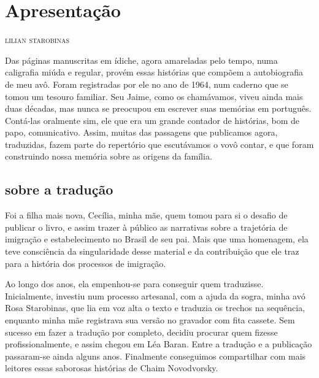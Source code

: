 \pagestyle{plain}
\newcommand{\subtitulo}[1]{\NoCaseChange{\textnormal{\break\Large\itshape#1}}}
\chapter*{Apresentação\smallskip\subtitulo{Um road movie em forma\\de narrativa}}


\begin{flushright}
\textsc{lilian starobinas}
\end{flushright}\medskip

\noindent{}Das páginas manuscritas em ídiche, agora amareladas pelo tempo, numa
caligrafia miúda e regular, provém essas histórias que compõem a
autobiografia de meu avô. Foram registradas por ele no ano de 1964, num
caderno que se tomou um tesouro familiar. Seu Jaime, como os chamávamos,
viveu ainda mais duas décadas, mas nunca se preocupou em escrever suas
memórias em português. Contá-las oralmente sim, ele que era um grande
contador de histórias, bom de papo, comunicativo. Assim, muitas das
passagens que publicamos agora, traduzidas, fazem parte do repertório que
escutávamos o vovô contar, e que foram construindo nossa memória sobre
as origens da família.

\section{sobre a tradução}

Foi a filha mais nova, Cecília, minha mãe, quem tomou para si o desafio
de publicar o livro, e assim trazer à público as narrativas sobre a
trajetória de imigração e estabelecimento no Brasil de seu pai. Mais que
uma homenagem, ela teve consciência da singularidade desse material e da
contribuição que ele traz para a história dos processos de imigração.

Ao longo dos anos, ela empenhou-se para conseguir quem traduzisse.
Inicialmente, investiu num processo artesanal, com a ajuda da sogra,
minha avó Rosa Starobinas, que lia em voz alta o texto e traduzia os
trechos na sequência, enquanto minha mãe registrava sua versão no
gravador com fita cassete. Sem sucesso em fazer a tradução por completo,
decidiu procurar quem fizesse profissionalmente, e assim chegou em Léa
Baran. Entre a tradução e a publicação passaram-se ainda alguns anos.
Finalmente conseguimos compartilhar com mais leitores essas saborosas
histórias de Chaim Novodvorsky.


